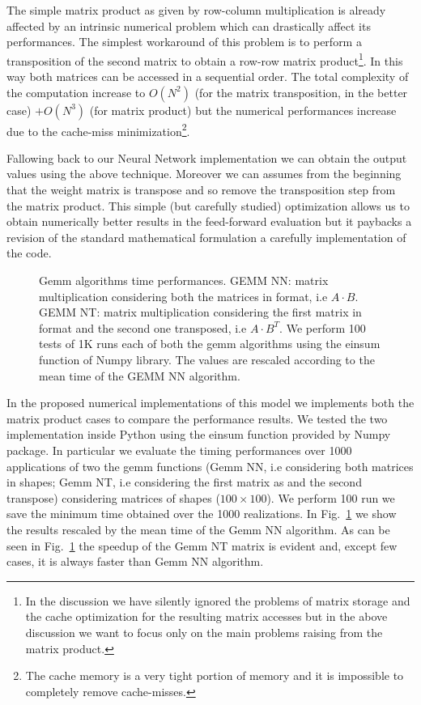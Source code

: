 \documentclass{standalone}
\begin{document}
The simple matrix product as given by row-column multiplication is already affected by an intrinsic numerical problem which can drastically affect its performances.
The simplest workaround of this problem is to perform a transposition of the second matrix to obtain a row-row matrix product\footnote{
  In the discussion we have silently ignored the problems of matrix storage and the cache optimization for the resulting matrix accesses but in the above discussion we want to focus only on the main problems raising from the matrix product.
}.
In this way both matrices can be accessed in a sequential order.
The total complexity of the computation increase to $O(N^2)$ (for the matrix transposition, in the better case) $+ O(N^3)$ (for matrix product) but the numerical performances increase due to the cache-miss minimization\footnote{
  The cache memory is a very tight portion of memory and it is impossible to completely remove cache-misses.
}.

Fallowing back to our Neural Network implementation we can obtain the output values using the above technique.
Moreover we can assumes from the beginning that the weight matrix is transpose and so remove the transposition step from the matrix product.
This simple (but carefully studied) optimization allows us to obtain numerically better results in the feed-forward evaluation but it paybacks a revision of the standard mathematical formulation a carefully implementation of the code.

\begin{figure}[htbp]
\centering
\def\svgwidth{\textwidth}

\caption{Gemm algorithms time performances.
GEMM NN: matrix multiplication considering both the matrices in  format, i.e $A\cdot B$.
GEMM NT: matrix multiplication considering the first matrix in  format and the second one transposed, i.e $A\cdot B^T$.
We perform 100 tests of 1K runs each of both the gemm algorithms using the \textsf{einsum} function of Numpy library.
The values are rescaled according to the mean time of the GEMM NN algorithm.
}
\label{fig:gemm}
\end{figure}

In the proposed numerical implementations of this model we implements both the matrix product cases to compare the performance results.
We tested the two implementation inside Python using the \textsf{einsum} function provided by Numpy package.
In particular we evaluate the timing performances over 1000 applications of two the gemm functions (Gemm NN, i.e considering both matrices in  shapes; Gemm NT, i.e considering the first matrix as  and the second transpose) considering matrices of shapes ($100\times100$).
We perform 100 run we save the minimum time obtained over the 1000 realizations.
In Fig.~\ref{fig:gemm} we show the results rescaled by the mean time of the Gemm NN algorithm.
As can be seen in Fig.~\ref{fig:gemm} the speedup of the Gemm NT matrix is evident and, except few cases, it is always faster than Gemm NN algorithm.
\end{document}
